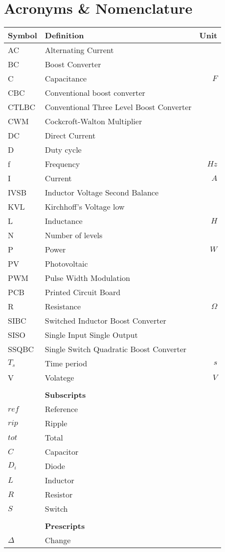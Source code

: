 \chapter*{Acronyms \& Nomenclature}
\begin{tabular*}{\textwidth}{@{\extracolsep{\fill}} l l r}
	\textbf{Symbol}	& \textbf{Definition}			& \textbf{Unit}\\
	\hline
	AC			& Alternating Current				& \\
	BC			& Boost Converter					& \\
	C			& Capacitance						& $F$\\
	CBC			& Conventional boost converter					& \\
	CTLBC		&Conventional Three Level Boost Converter		& \\
	CWM		    & Cockcroft-Walton Multiplier 		& \\
	DC			& Direct Current					& \\
	D			& Duty cycle					& \\
	f			& Frequency					& $Hz$\\
	I			& Current							& $A$\\
	IVSB		& Inductor Voltage Second Balance				& \\
	KVL			& Kirchhoff's Voltage low				& \\
	L			& Inductance					& $H$\\
	N			& Number of levels						& \\
	P			& Power								& $W$\\
	PV			& Photovoltaic						& \\
	PWM			& Pulse Width Modulation						& \\
	PCB			& Printed Circuit Board					& \\
	R			& Resistance						& $\Omega$\\
	SIBC			&Switched Inductor Boost Converter			& \\
	SISO		& Single Input Single Output		& \\
	SSQBC			&Single Switch Quadratic Boost Converter	& \\
	$T_s$		& Time period					&$s$ \\
	V			& Volatege							& $V$\\
	\hline \hline
				& 									&	\\
				& \textbf{Subscripts}				&	\\
	\hline
	$ref$		& Reference							&	\\
	$rip$		& Ripple							&	\\
	$tot$		& Total								&	\\
	
	$C$			& Capacitor							&	\\
	$D_i$		& Diode							&	\\
	$L$			& Inductor							&	\\
	$R$			& Resistor							&	\\
	$S$			& Switch							&	\\
	\hline \hline
				& 									&	\\
				& \textbf{Prescripts}				&	\\
	\hline
	$\Delta$	& Change							&	\\
	\hline \hline
\end{tabular*}
